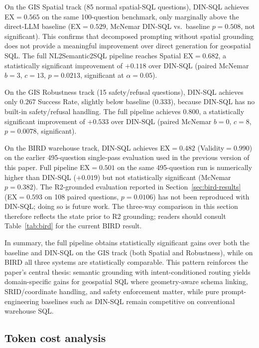 \documentclass[11pt]{article}
\begin{document}
On the GIS Spatial track (85 normal spatial-SQL questions), DIN-SQL achieves EX$=0.565$ on the same 100-question benchmark, only marginally above the direct-LLM baseline (EX$=0.529$, McNemar DIN-SQL vs.\ baseline $p=0.508$, not significant). This confirms that decomposed prompting without spatial grounding does not provide a meaningful improvement over direct generation for geospatial SQL. The full NL2Semantic2SQL pipeline reaches Spatial EX$=0.682$, a statistically significant improvement of $+0.118$ over DIN-SQL (paired McNemar $b=3$, $c=13$, $p=0.0213$, significant at $\alpha=0.05$).

On the GIS Robustness track (15 safety/refusal questions), DIN-SQL achieves only $0.267$ Success Rate, slightly below baseline ($0.333$), because DIN-SQL has no built-in safety/refusal handling. The full pipeline achieves $0.800$, a statistically significant improvement of $+0.533$ over DIN-SQL (paired McNemar $b=0$, $c=8$, $p=0.0078$, significant).

On the BIRD warehouse track, DIN-SQL achieves EX$=0.482$ (Validity$=0.990$) on the earlier 495-question single-pass evaluation used in the previous version of this paper. Full pipeline EX$=0.501$ on the same 495-question run is numerically higher than DIN-SQL ($+0.019$) but not statistically significant (McNemar $p=0.382$). The R2-grounded evaluation reported in Section~\ref{sec:bird-results} (EX$=0.593$ on 108 paired questions, $p=0.0106$) has not been reproduced with DIN-SQL; doing so is future work. The three-way comparison in this section therefore reflects the state prior to R2 grounding; readers should consult Table~\ref{tab:bird} for the current BIRD result.

In summary, the full pipeline obtains statistically significant gains over both the baseline and DIN-SQL on the GIS track (both Spatial and Robustness), while on BIRD all three systems are statistically comparable. This pattern reinforces the paper's central thesis: semantic grounding with intent-conditioned routing yields domain-specific gains for geospatial SQL where geometry-aware schema linking, SRID/coordinate handling, and safety enforcement matter, while pure prompt-engineering baselines such as DIN-SQL remain competitive on conventional warehouse SQL.

\subsection{Token cost analysis}
\label{sec:tokens}
\end{document}
